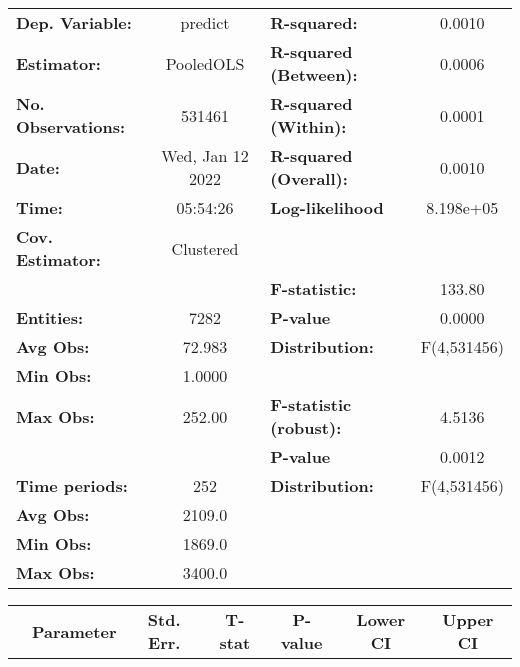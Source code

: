 \begin{center}
\begin{tabular}{lclc}
\toprule
\textbf{Dep. Variable:}    &      predict       & \textbf{  R-squared:         }   &      0.0010      \\
\textbf{Estimator:}        &     PooledOLS      & \textbf{  R-squared (Between):}  &      0.0006      \\
\textbf{No. Observations:} &       531461       & \textbf{  R-squared (Within):}   &      0.0001      \\
\textbf{Date:}             &  Wed, Jan 12 2022  & \textbf{  R-squared (Overall):}  &      0.0010      \\
\textbf{Time:}             &      05:54:26      & \textbf{  Log-likelihood     }   &    8.198e+05     \\
\textbf{Cov. Estimator:}   &     Clustered      & \textbf{                     }   &                  \\
\textbf{}                  &                    & \textbf{  F-statistic:       }   &      133.80      \\
\textbf{Entities:}         &        7282        & \textbf{  P-value            }   &      0.0000      \\
\textbf{Avg Obs:}          &       72.983       & \textbf{  Distribution:      }   &   F(4,531456)    \\
\textbf{Min Obs:}          &       1.0000       & \textbf{                     }   &                  \\
\textbf{Max Obs:}          &       252.00       & \textbf{  F-statistic (robust):} &      4.5136      \\
\textbf{}                  &                    & \textbf{  P-value            }   &      0.0012      \\
\textbf{Time periods:}     &        252         & \textbf{  Distribution:      }   &   F(4,531456)    \\
\textbf{Avg Obs:}          &       2109.0       & \textbf{                     }   &                  \\
\textbf{Min Obs:}          &       1869.0       & \textbf{                     }   &                  \\
\textbf{Max Obs:}          &       3400.0       & \textbf{                     }   &                  \\
\bottomrule
\end{tabular}
\begin{tabular}{lcccccc}
                & \textbf{Parameter} & \textbf{Std. Err.} & \textbf{T-stat} & \textbf{P-value} & \textbf{Lower CI} & \textbf{Upper CI}  \\

\end{tabular}
\end{center}
